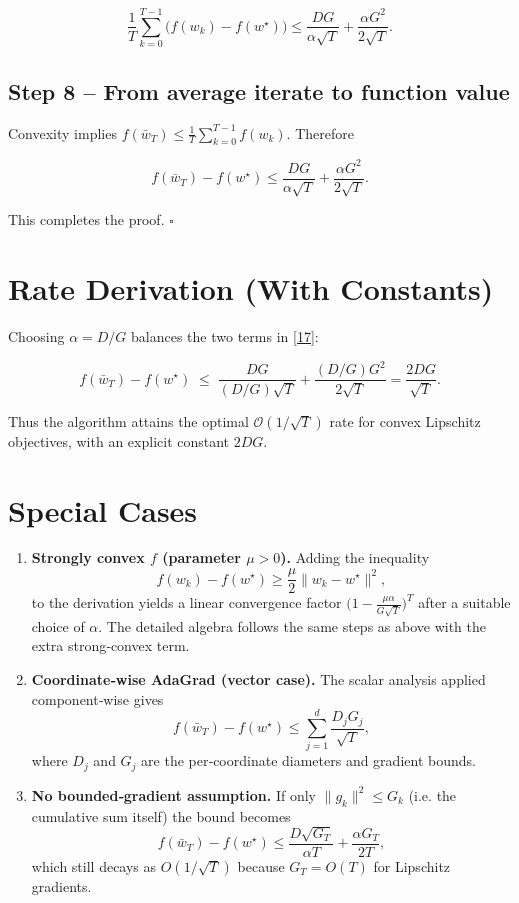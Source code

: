 \documentclass{article}
\begin{document}
\[
\frac{1}{T}\sum_{k=0}^{T-1}\bigl(f(w_{k})-f(w^{\star})\bigr)
\le
\frac{DG}{\alpha\sqrt{T}}+\frac{\alpha G^{2}}{2\sqrt{T}} .
\tag{16}
\]

\subsection*{Step 8 – From average iterate to function value}
Convexity implies
\(f(\bar w_{T})\le\frac{1}{T}\sum_{k=0}^{T-1}f(w_{k})\).  Therefore

\[
f(\bar w_{T})-f(w^{\star})
\le
\frac{DG}{\alpha\sqrt{T}}+\frac{\alpha G^{2}}{2\sqrt{T}} .
\tag{17}
\]

This completes the proof. \(\square\)

\section*{Rate Derivation (With Constants)}
Choosing \(\alpha = D/G\) balances the two terms in \eqref{17}:

\[
f(\bar w_{T})-f(w^{\star})
\;\le\;
\frac{DG}{(D/G)\sqrt{T}}+\frac{(D/G)G^{2}}{2\sqrt{T}}
=
\frac{2DG}{\sqrt{T}} .
\tag{18}
\]

Thus the algorithm attains the optimal \(\mathcal{O}(1/\sqrt{T})\) rate for
convex Lipschitz objectives, with an explicit constant \(2DG\).

\section*{Special Cases}
\begin{enumerate}
\item \textbf{Strongly convex $f$ (parameter $\mu>0$).}
   Adding the inequality
   \[
   f(w_{k})-f(w^{\star})\ge \frac{\mu}{2}\|w_{k}-w^{\star}\|^{2},
   \]
   to the derivation yields a linear convergence factor
   \(\bigl(1-\frac{\mu\alpha}{G\sqrt{T}}\bigr)^{T}\) after a suitable
   choice of \(\alpha\).  The detailed algebra follows the same steps as
   above with the extra strong‑convex term.

\item \textbf{Coordinate‑wise AdaGrad (vector case).}
   The scalar analysis applied component‑wise gives
   \[
   f(\bar w_{T})-f(w^{\star})
   \le
   \sum_{j=1}^{d}\frac{D_{j}G_{j}}{\sqrt{T}},
   \]
   where \(D_{j}\) and \(G_{j}\) are the per‑coordinate diameters and
   gradient bounds.

\item \textbf{No bounded‑gradient assumption.}
   If only \(\|g_{k}\|^{2}\le G_{k}\) (i.e. the cumulative sum itself) the bound
   becomes
   \[
   f(\bar w_{T})-f(w^{\star})\le
   \frac{D\sqrt{G_{T}}}{\alpha T}+\frac{\alpha G_{T}}{2T},
   \]
   which still decays as \(O(1/\sqrt{T})\) because \(G_{T}=O(T)\) for
   Lipschitz gradients.
\end{enumerate}
\end{document}
